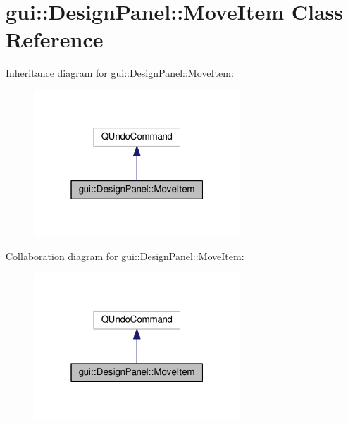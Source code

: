 \hypertarget{classgui_1_1DesignPanel_1_1MoveItem}{}\section{gui\+:\+:Design\+Panel\+:\+:Move\+Item Class Reference}
\label{classgui_1_1DesignPanel_1_1MoveItem}


Inheritance diagram for gui\+:\+:Design\+Panel\+:\+:Move\+Item\+:\nopagebreak
\begin{figure}[H]
\begin{center}
\leavevmode
\includegraphics[width=220pt]{classgui_1_1DesignPanel_1_1MoveItem__inherit__graph}
\end{center}
\end{figure}


Collaboration diagram for gui\+:\+:Design\+Panel\+:\+:Move\+Item\+:\nopagebreak
\begin{figure}[H]
\begin{center}
\leavevmode
\includegraphics[width=220pt]{classgui_1_1DesignPanel_1_1MoveItem__coll__graph}
\end{center}
\end{figure}
